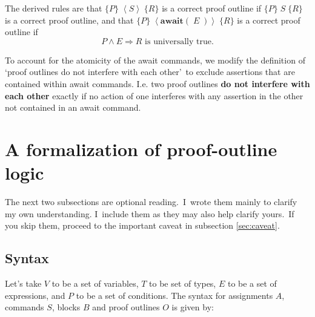 \documentclass[muchmore,11pt]{article}%
\begin{document}
The derived rules are that $\{P\}\;\left\langle S\right\rangle \;\{R\}$ is a
correct proof outline if $\{P\}\;S\;\{R\}$ is a correct proof outline, and
that $\{P\}\;\left\langle \mathbf{await}(\;E\;)\right\rangle \;\{R\}$ is a
correct proof outline if
\[
P\wedge E\Rightarrow R\text{ is universally true.}%
\]


To account for the atomicity of the await commands, we modify the definition
of `proof outlines do not interfere with each other'\ to exclude assertions
that are contained within await commands. I.e. two proof outlines \textbf{do
not interfere with each other} exactly if no action of one interferes with any
assertion in the other not contained in an await command.

\section{A formalization of proof-outline logic\label{formalization}}

The next two subsections are optional reading.\ I\ wrote them mainly to
clarify my own understanding. I\ include them as they may also help clarify
yours.\ If you skip them, proceed to the important caveat in subsection
\ref{sec:caveat}.

\subsection{Syntax}

Let's take $V$ to be a set of variables, $T$ to be set of types, $E$ to be a
set of expressions, and $P$ to be a set of conditions. The syntax for
assignments $A$, commands $S$, blocks $B$ and proof outlines $O$ is given by:%
\end{document}
